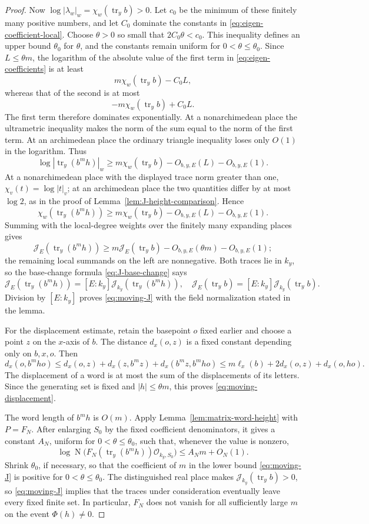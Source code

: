 \documentclass[11pt,reqno]{amsart}
\theoremstyle{definition}
\theoremstyle{remark}
\newcommand{\cO}{\mathcal O}
\newcommand{\cJ}{\mathcal J}
\newcommand{\Tr}{\operatorname{tr}}
\newcommand{\Norm}{\operatorname{N}}
\begin{document}
\begin{proof}
Now \(\log|\lambda_w|_w=\chi_w(\Tr_y b)>0\).  Let \(c_0\) be the minimum
of these finitely many positive numbers, and let \(C_0\) dominate the
constants in \eqref{eq:eigen-coefficient-local}.  Choose \(\theta>0\) so
small that \(2C_0\theta<c_0\).  This inequality defines an upper bound
\(\theta_0\) for \(\theta\), and the constants remain uniform for
\(0<\theta\le\theta_0\).  Since \(L\le\theta m\), the logarithm of
the absolute value of the first term in
\eqref{eq:eigen-coefficients} is at least
\[
 m\chi_w(\Tr_y b)-C_0L,
\]
whereas that of the second is at most
\[
 -m\chi_w(\Tr_y b)+C_0L.
\]
The first term therefore dominates exponentially.  At a nonarchimedean
place the ultrametric inequality makes the norm of the sum equal to the norm
of the first term.  At an archimedean place the ordinary triangle inequality
loses only \(O(1)\) in the logarithm.  Thus
\[
 \log|\Tr_y(b^mh)|_w
 \ge m\chi_w(\Tr_y b)-O_{b,y,E}(L)-O_{b,y,E}(1).
\]
At a nonarchimedean place with the displayed trace norm greater than one,
\(\chi_v(t)=\log|t|_v\); at an archimedean place the two quantities differ
by at most \(\log2\), as in the proof of
Lemma~\ref{lem:J-height-comparison}.  Hence
\[
 \chi_w(\Tr_y(b^mh))
 \ge m\chi_w(\Tr_y b)-O_{b,y,E}(L)-O_{b,y,E}(1).
\]
Summing with the local-degree weights over the finitely many expanding
places gives
\[
 \cJ_E(\Tr_y(b^mh))
 \ge m\cJ_E(\Tr_yb)-O_{b,y,E}(\theta m)-O_{b,y,E}(1);
\]
the remaining local summands on the left are nonnegative.  Both traces lie
in \(k_y\), so the base-change formula
\eqref{eq:J-base-change} says
\[
 \cJ_E(\Tr_y(b^mh))=[E:k_y]\cJ_{k_y}(\Tr_y(b^mh)),
 \quad
 \cJ_E(\Tr_yb)=[E:k_y]\cJ_{k_y}(\Tr_yb).
\]
Division by \([E:k_y]\) proves \eqref{eq:moving-J} with the field
normalization stated in the lemma.

For the displacement estimate, retain the basepoint \(o\) fixed earlier and
choose a point \(z\) on the \(x\)-axis of \(b\).  The distance
\(d_x(o,z)\) is a fixed constant depending only on \(b,x,o\).  Then
\[
 d_x(o,b^m h o)
 \le d_x(o,z)+d_x(z,b^mz)+d_x(b^mz,b^mho)
 \le m\ell_x(b)+2d_x(o,z)+d_x(o,ho).
\]
The displacement of a word is at most the sum of the displacements of its
letters.  Since the generating set is fixed and \(|h|\le\theta m\), this
proves \eqref{eq:moving-displacement}.

The word length of \(b^mh\) is \(O(m)\).  Apply
Lemma~\ref{lem:matrix-word-height} with \(P=F_N\).  After enlarging
\(S_0\) by the fixed coefficient denominators, it gives a constant \(A_N\),
uniform for \(0<\theta\le\theta_0\), such that, whenever the value is
nonzero,
\begin{equation}\label{eq:FN-height-bound}
 \log\Norm\bigl(F_N(\Tr_y(b^mh))\cO_{k_y,S_0}\bigr)
 \le A_Nm+O_N(1).
\end{equation}
Shrink \(\theta_0\), if necessary, so that the coefficient of \(m\) in
the lower bound \eqref{eq:moving-J} is positive for
\(0<\theta\le\theta_0\).
The distinguished real place makes \(\cJ_{k_y}(\Tr_y b)>0\), so
\eqref{eq:moving-J} implies that the traces under consideration eventually
leave every fixed finite set.  In particular, \(F_N\) does not vanish for
all sufficiently large \(m\) on the event \(\Phi(h)\ne0\).


\end{proof}
\end{document}
